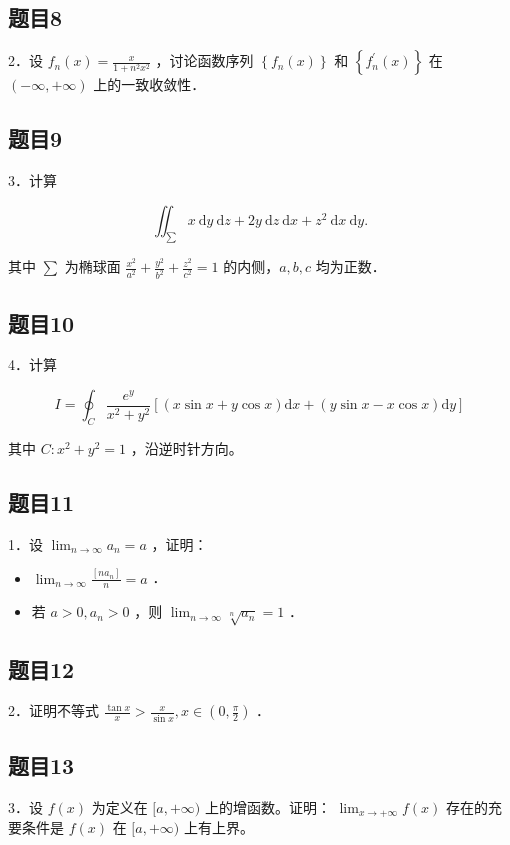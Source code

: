 \documentclass{article}
\begin{document}
\subsection{题目8}
2．设 \(f_{n}(x)=\frac{x}{1+n^{2} x^{2}}\) ，讨论函数序列 \(\left\{f_{n}(x)\right\}\) 和 \(\left\{f_{n}^{\prime}(x)\right\}\) 在 \((-\infty,+\infty)\) 上的一致收敛性．

\subsection{题目9}
3．计算

\[
\iint_{\sum} x \mathrm{~d} y \mathrm{~d} z+2 y \mathrm{~d} z \mathrm{~d} x+z^{2} \mathrm{~d} x \mathrm{~d} y .
\]

其中 \(\sum\) 为椭球面 \(\frac{x^{2}}{a^{2}}+\frac{y^{2}}{b^{2}}+\frac{z^{2}}{c^{2}}=1\) 的内侧，\(a, b, c\) 均为正数．

\subsection{题目10}
4．计算

\[
I=\oint_{C} \frac{e^{y}}{x^{2}+y^{2}}[(x \sin x+y \cos x) \mathrm{d} x+(y \sin x-x \cos x) \mathrm{d} y]
\]

其中 \(C: x^{2}+y^{2}=1\) ，沿逆时针方向。

\subsection{题目11}
1．设 \(\lim _{n \rightarrow \infty} a_{n}=a\) ，证明：

\begin{itemize}
  \item[（1）] \(\lim _{n \rightarrow \infty} \frac{\left[n a_{n}\right]}{n}=a\) ．
  \item[（2）] 若 \(a>0, a_{n}>0\) ，则 \(\lim _{n \rightarrow \infty} \sqrt[n]{a_{n}}=1\) ．
\end{itemize}

\subsection{题目12}
2．证明不等式 \(\frac{\tan x}{x}>\frac{x}{\sin x}, x \in\left(0, \frac{\pi}{2}\right)\) ．

\subsection{题目13}
3．设 \(f(x)\) 为定义在 \([a,+\infty)\) 上的增函数。证明： \(\lim _{x \rightarrow+\infty} f(x)\) 存在的充要条件是 \(f(x)\) 在 \([a,+\infty)\) 上有上界。
\end{document}
